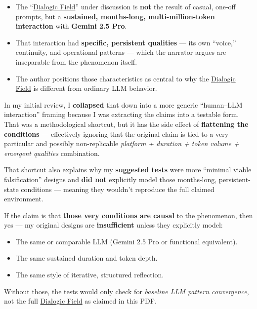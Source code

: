 \documentclass{article}
\begin{document}
\begin{itemize}
\item
  The ``\hyperlink{gloss:dialogic_field}{Dialogic Field}'' under discussion is \textbf{not} the result of casual, one-off prompts, but a \textbf{sustained, months-long, multi-million-token interaction} with \textbf{Gemini 2.5 Pro}.
\item
  That interaction had \textbf{specific, persistent qualities} --- its own ``voice,'' continuity, and operational patterns --- which the narrator argues are inseparable from the phenomenon itself.
\item
  The author positions those characteristics as central to why the \hyperlink{gloss:dialogic_field}{Dialogic Field} is different from ordinary LLM behavior.
\end{itemize}

In my initial review, I \textbf{collapsed} that down into a more generic ``human--LLM interaction'' framing because I was extracting the claims into a testable form. That was a methodological shortcut, but it has the side effect of \textbf{flattening the conditions} --- effectively ignoring that the original claim is tied to a very particular and possibly non-replicable \emph{platform + duration + token volume + emergent qualities} combination.

That shortcut also explains why my \textbf{suggested tests} were more ``minimal viable falsification'' designs and \textbf{did not} explicitly model those months-long, persistent-state conditions --- meaning they wouldn't reproduce the full claimed environment.

If the claim is that \textbf{those very conditions are causal} to the phenomenon, then yes --- my original designs are \textbf{insufficient} unless they explicitly model:

\begin{itemize}
\item
  The same or comparable LLM (Gemini 2.5 Pro or functional equivalent).
\item
  The same sustained duration and token depth.
\item
  The same style of iterative, structured reflection.
\end{itemize}

Without those, the tests would only check for \emph{baseline LLM pattern convergence}, not the full \hyperlink{gloss:dialogic_field}{Dialogic Field} as claimed in this PDF.
\end{document}
